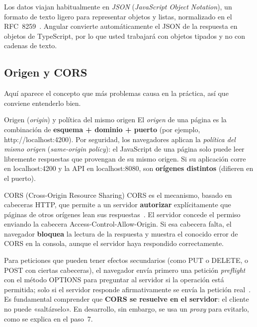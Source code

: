\documentclass[11pt,a4paper]{article}
\newcommand{\code}[1]{{\ttfamily\color{ngdark}#1}}
\begin{document}
Los datos viajan habitualmente en \emph{JSON} (\emph{JavaScript Object Notation}), un formato de texto ligero para representar objetos y listas, normalizado en el RFC~8259~\cite{rfc8259}. Angular convierte automáticamente el JSON de la respuesta en objetos de TypeScript, por lo que usted trabajará con objetos tipados y no con cadenas de texto.

\subsection{Origen y CORS}

Aquí aparece el concepto que más problemas causa en la práctica, así que conviene entenderlo bien.

\begin{concepto}{Origen (\emph{origin}) y política del mismo origen}
	El \emph{origen} de una página es la combinación de \textbf{esquema + dominio + puerto} (por ejemplo, \code{http://localhost:4200}). Por seguridad, los navegadores aplican la \emph{política del mismo origen} (\emph{same-origin policy}): el JavaScript de una página solo puede leer libremente respuestas que provengan de su mismo origen. Si su aplicación corre en \code{localhost:4200} y la API en \code{localhost:8080}, son \textbf{orígenes distintos} (difieren en el puerto).
\end{concepto}

\begin{concepto}{CORS (Cross-Origin Resource Sharing)}
	CORS es el mecanismo, basado en cabeceras HTTP, que permite a un servidor \textbf{autorizar} explícitamente que páginas de otros orígenes lean sus respuestas~\cite{mdncors,whatwgfetch}. El servidor concede el permiso enviando la cabecera \code{Access-Control-Allow-Origin}. Si esa cabecera falta, el navegador \textbf{bloquea} la lectura de la respuesta y muestra el conocido error de CORS en la consola, aunque el servidor haya respondido correctamente.
\end{concepto}

Para peticiones que pueden tener efectos secundarios (como \code{PUT} o \code{DELETE}, o \code{POST} con ciertas cabeceras), el navegador envía primero una petición \emph{preflight} con el método \code{OPTIONS} para preguntar al servidor si la operación está permitida; solo si el servidor responde afirmativamente se envía la petición real~\cite{mdncors}. Es fundamental comprender que \textbf{CORS se resuelve en el servidor}: el cliente no puede «saltárselo». En desarrollo, sin embargo, se usa un \emph{proxy} para evitarlo, como se explica en el paso~7.
\end{document}
